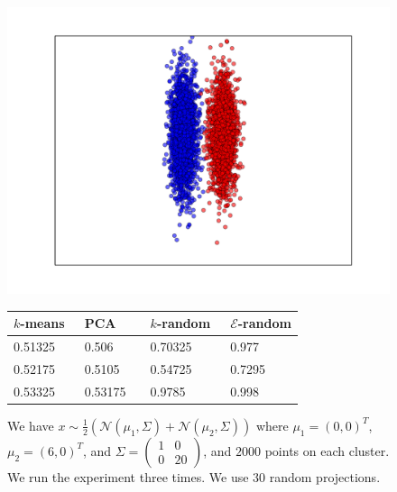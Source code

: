 \documentclass[aps,preprint,nofootinbib,floatfix]{revtex4-1}
\begin{document}
\begin{figure}
\begin{minipage}{.49\textwidth}
\includegraphics[scale=.45]{2d_cigar.pdf}
\end{minipage}
\begin{minipage}{.49\textwidth}
\begin{tabular}{ l l l l}
\hline
$k$-means~ & PCA~~~ & $k$-random~ & $\mathcal{E}$-random \\
\hline
0.51325 &
0.506 &
0.70325 &
0.977 \\
0.52175 &
0.5105 &
0.54725 &
0.7295 \\
0.53325 &
0.53175 &
0.9785 &
0.998 \\
%
\hline
\end{tabular}
\end{minipage}
\caption{\label{fig:cigar}
We have $x \sim \tfrac{1}{2}\left( \mathcal{N}(\mu_1, \Sigma) +
\mathcal{N}(\mu_2, \Sigma)\right)$ where $\mu_1 = (0,0)^T$, $\mu_2=(6,0)^T$,
and $\Sigma = \left( \begin{smallmatrix} 1 & 0 \\ 0 & 20 \end{smallmatrix}
\right)$,
and $2000$ points on each cluster. We run the experiment three times.
We use $30$ random projections.
}
\end{figure}
\end{document}
